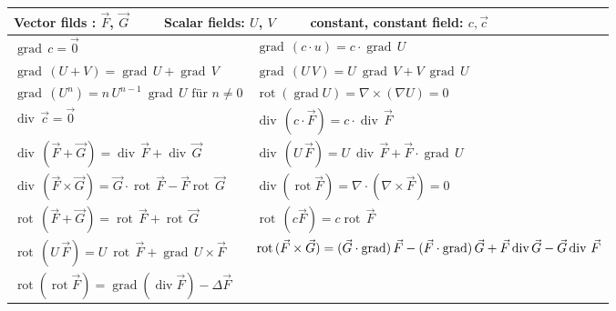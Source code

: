 {	
\renewcommand{\arraystretch}{1.2}					
	\begin{tabularx}{\textwidth}{|X|X|}
		\hline 
		\multicolumn{2}{|l|}{
		Vector filds : $\vec F$, $\vec G$  $\qquad$ 
		Scalar fields: $U$, $V$	           $\qquad$ 
		constant, constant field: $c, \vec{c}$}\\			
		
		\hline
		$\operatorname{grad}\,c=\vec{0}$ & $\operatorname{grad}\,(c\cdot u)=c\cdot\operatorname{grad}\,U$    \\

		$\operatorname{grad}\,(U+V)=\operatorname{grad}\,U+\operatorname{grad}\,V$ &
		$\operatorname{grad}\,(U\,V) = U\ \operatorname{grad}\,V + V\ \operatorname{grad}\,U$\\

		$\label{eqn:ProduktregelEinesGradientMitPotenzen}
		\operatorname{grad}\,(U^n) = n\, U^{n-1}\ \operatorname{grad}\,U \text{ für } n\neq 0$&
		$\operatorname{rot}(\operatorname{grad}U)=\nabla \times (\nabla U) = 0$ \\
		\hline\hline
		$\operatorname{div}\,\vec{c}=\vec{0}$&
		$\operatorname{div}\,(c\cdot \vec{F})=c\cdot\operatorname{div}\,\vec{F}$ \\
		
		$\operatorname{div}\,(\vec{F}+\vec{G})=\operatorname{div}\,\vec{F}+\operatorname{div}\,\vec{G}$ &
		$\operatorname{div}\,(U\,\vec{F}) = U\ \operatorname{div}\,\vec{F} + \vec{F}\cdot \operatorname{grad}\,U$\\		

		$\operatorname{div}\,(\vec{F} \times\vec{G})=\vec{G}\cdot \operatorname{rot}\,\vec{F} - \vec{F}\operatorname{rot}\,\vec{G}$ &
		$\operatorname{div}(\operatorname{rot}\vec{F}) = \nabla \cdot (\nabla \times\vec F) = 0$\\
		\hline\hline
		
		$\operatorname{rot}\,(\vec{F}+\vec{G})=\operatorname{rot}\,\vec{F}+\operatorname{rot}\,\vec{G}$ &
		$\operatorname{rot}\,(c \vec{F})=c\operatorname{rot}\,\vec{F}$ \\

		$\operatorname{rot}\,(U\,\vec{F}) = U\ \operatorname{rot}\,\vec{F} + \operatorname{grad}\,U \times \vec{F}$&
		$\operatorname{rot}\,(\vec{F} \times\vec{G}) =\newline (\vec{G}\cdot \operatorname{grad})\,\vec{F} - (\vec{F}\cdot \operatorname{grad})\,\vec{G} + \vec{F}\operatorname{div}\vec{G} - \vec{G}\operatorname{div}\,\vec{F}$
		\\
		\hline\hline
		$	\operatorname{rot}(\operatorname{rot}\vec{F}) = \operatorname{grad}(\operatorname{div}\vec{F}) -\Delta \vec{F}$&\\


\end{tabularx}}

